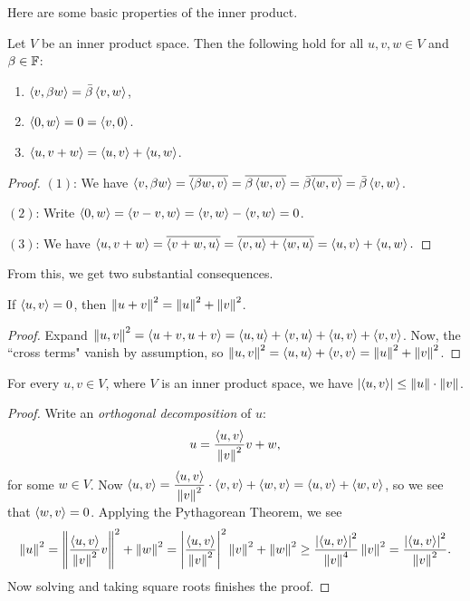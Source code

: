 \documentclass{article}
\begin{document}
Here are some basic properties of the inner product.
\begin{proposition}
Let $V$ be an inner product space. Then the following hold for all $u,v, w\in V$ and $\beta\in\F$:
\begin{enumerate}
    \item $\gen{v, \beta w} = \bar\beta \gen{v,w}$,
    \item $\gen{0, w} = 0 = \gen{v, 0}$.
    \item $\gen{u, v+w} = \gen{u,v} + \gen{u, w}$.
\end{enumerate}
\end{proposition}
\begin{proof}
$(1)$: We have $\gen{v, \beta w} = \overline{ \gen{\beta w, v}} = \overline{\beta \gen{w,v}} = \bar\beta \overline{\gen{w,v}} = \bar\beta\gen{v,w}$.

$(2)$: Write $\gen{0, w} = \gen{v-v, w} = \gen{v,w} - \gen{v,w} = 0$.
\vspace{0.1 cm}

$(3)$: We have $\gen{u, v+w} = \overline{\gen{v+w, u}} = \overline{\gen{v,u} + \gen{w,u}} = \gen{u,v} + \gen{u,w}.$
\end{proof}
From this, we get two substantial consequences.
\begin{theorem}
If $\gen{u, v} = 0$, then $\norm{u+v}^2 = \norm u^2 + \norm v^2$.
\end{theorem}
\begin{proof}
Expand $\norm{u,v}^2 =\gen{u+v, u+v} = \gen{u,u} + \gen{v,u} + \gen{u,v} + \gen{v,v}$. Now, the ``cross terms" vanish by assumption, so $\norm{u,v}^2 = \gen{u ,u} +\gen{v,v} = \norm u^2 + \norm v^2$.
\end{proof}
\begin{theorem}
For every $u, v\in V$, where $V$ is an inner product space, we have $\abs{\gen{u,v}} \leq \norm u \cdot \norm v$.
\end{theorem}
\begin{proof}
Write an \textit{orthogonal decomposition} of $u$:
$$u = \frac{\gen{u,v}}{\norm v^2}v + w,$$
for some $w\in V$. Now $\ds\gen{u,v} = \frac{\gen{u, v}}{\norm v^2}\cdot \gen{v,v} + \gen{w,v} = \gen{u,v} + \gen{w,v}$, so we see that $\gen{w,v} = 0$. Applying the Pythagorean Theorem, we see
$$\norm u^2 = \norm{\frac{\gen{u,v}}{\norm v^2}v}^2 + \norm w^2 = \abs{\frac{\gen{u,v}}{\norm v^2}}^2 \norm v^2 + \norm w^2 \geq \frac{\abs{\gen{u,v}}^2}{\norm v^4}\norm v^2 = \frac{\abs{\gen{u,v}}^2}{\norm v^2}.$$
Now solving and taking square roots finishes the proof.
\end{proof}
\end{document}
